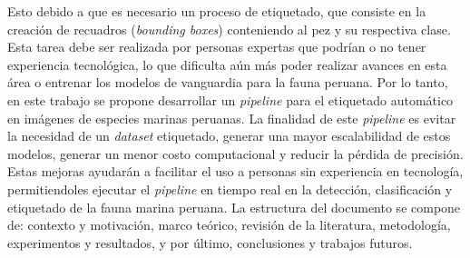 Esto debido a que es necesario un proceso de etiquetado, que consiste en la creación 
de recuadros (\textit{bounding boxes}) conteniendo al pez y su respectiva clase.
Esta tarea debe ser realizada por personas expertas que podrían o no tener experiencia 
tecnológica, lo que dificulta aún más poder realizar avances en esta área o entrenar 
los modelos de vanguardia para la fauna peruana. 
\newline
\newline
Por lo tanto, en este trabajo se propone desarrollar un \textit{pipeline} 
para el etiquetado automático en imágenes de especies marinas peruanas. 
La finalidad de este \textit{pipeline} es evitar la necesidad de un 
\textit{dataset} etiquetado, generar una mayor escalabilidad de estos 
modelos, generar un menor costo computacional y reducir la pérdida de 
precisión. Estas mejoras ayudarán a facilitar el uso a personas sin experiencia 
en tecnología, permitiendoles ejecutar el \textit{pipeline} en tiempo real 
en la detección, clasificación y etiquetado de la fauna marina peruana. 
\newline
\newline
La estructura del documento se compone de: contexto y motivación, marco 
teórico, revisión de la literatura, metodología, experimentos y resultados, 
y por último, conclusiones y trabajos futuros.
